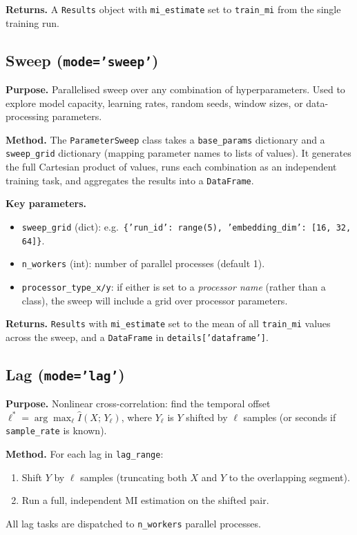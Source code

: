 \documentclass[12pt]{article}
\newcommand{\api}[1]{\texttt{#1}}
\begin{document}
\textbf{Returns.}  A \api{Results} object with \api{mi\_estimate} set to
\api{train\_mi} from the single training run.

\subsection{Sweep (\texttt{mode='sweep'})}
\label{sec:modes:sweep}

\textbf{Purpose.}  Parallelised sweep over any combination of
hyperparameters.  Used to explore model capacity, learning rates, random
seeds, window sizes, or data-processing parameters.

\textbf{Method.}  The \api{ParameterSweep} class takes a \api{base\_params}
dictionary and a \api{sweep\_grid} dictionary (mapping parameter names to
lists of values).  It generates the full Cartesian product of values,
runs each combination as an independent training task, and aggregates the
results into a \api{DataFrame}.

\textbf{Key parameters.}
\begin{itemize}[leftmargin=*]
  \item \api{sweep\_grid} (dict): e.g.\ \api{\{'run\_id': range(5),
        'embedding\_dim': [16, 32, 64]\}}.
  \item \api{n\_workers} (int): number of parallel processes (default 1).
  \item \api{processor\_type\_x/y}: if either is set to a
        \emph{processor name} (rather than a class), the sweep will
        include a grid over processor parameters.
\end{itemize}

\textbf{Returns.}  \api{Results} with \api{mi\_estimate} set to the mean
of all \api{train\_mi} values across the sweep, and a \api{DataFrame} in
\api{details['dataframe']}.

\subsection{Lag (\texttt{mode='lag'})}
\label{sec:modes:lag}

\textbf{Purpose.}  Nonlinear cross-correlation: find the temporal offset
$\ell^* = \arg\max_\ell \hat{I}(X;\,Y_{\ell})$, where $Y_\ell$ is $Y$
shifted by $\ell$ samples (or seconds if \api{sample\_rate} is known).

\textbf{Method.}  For each lag in \api{lag\_range}:
\begin{enumerate}[leftmargin=*]
  \item Shift $Y$ by $\ell$ samples (truncating both $X$ and $Y$ to the
        overlapping segment).
  \item Run a full, independent MI estimation on the shifted pair.
\end{enumerate}
All lag tasks are dispatched to \api{n\_workers} parallel processes.
\end{document}
